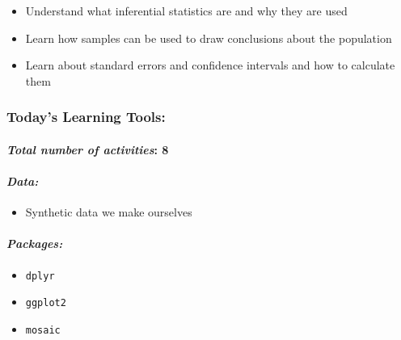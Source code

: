 \documentclass[
]{book}
\providecommand{\tightlist}{%
  \setlength{\itemsep}{0pt}\setlength{\parskip}{0pt}}
\begin{document}
\begin{itemize}
\tightlist
\item
  Understand what inferential statistics are and why they are used
\item
  Learn how samples can be used to draw conclusions about the population
\item
  Learn about standard errors and confidence intervals and how to calculate them
\end{itemize}

\hypertarget{todays-learning-tools-4}{%
\subsubsection*{\texorpdfstring{\textbf{Today's Learning Tools:}}{Today's Learning Tools:}}\label{todays-learning-tools-4}}

\hypertarget{total-number-of-activities-8-1}{%
\paragraph*{\texorpdfstring{\emph{Total number of activities}: 8}{Total number of activities: 8}}\label{total-number-of-activities-8-1}}

\hypertarget{data-4}{%
\paragraph*{\texorpdfstring{\emph{Data:}}{Data:}}\label{data-4}}

\begin{itemize}
\tightlist
\item
  Synthetic data we make ourselves
\end{itemize}

\hypertarget{packages-5}{%
\paragraph*{\texorpdfstring{\emph{Packages:}}{Packages:}}\label{packages-5}}

\begin{itemize}
\tightlist
\item
  \texttt{dplyr}
\item
  \texttt{ggplot2}
\item
  \texttt{mosaic}
\end{itemize}
\end{document}
